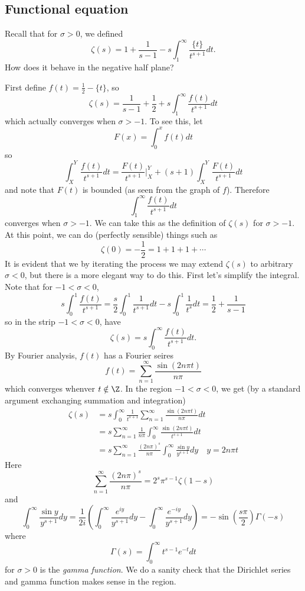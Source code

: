 \documentclass[a4paper]{article}
\theoremstyle{definition}
\begin{document}
\subsection{Functional equation}

Recall that for \(\sigma > 0\), we defined
\[
  \zeta(s) = 1 + \frac{1}{s - 1} - s \int_1^\infty \frac{\{t\}}{t^{s + 1}} dt.
\]
How does it behave in the negative half plane?

First define \(f(t) = \frac{1}{2} - \{t\}\), so
\[
  \zeta(s) = \frac{1}{s - 1} + \frac{1}{2} + s \int_1^\infty \frac{f(t)}{t^{s + 1}} dt
\]
which actually converges when \(\sigma > -1\). To see this, let
\[
  F(x) = \int_0^x f(t) dt
\]
so
\[
  \int_X^Y \frac{f(t)}{t^{s + 1}} dt
  = \frac{F(t)}{t^{s + 1}} \Big|_X^Y + (s + 1) \int_X^Y \frac{F(t)}{t^{s + 1}} dt
\]
and note that \(F(t)\) is bounded (as seen from the graph of \(f\)). Therefore
\[
  \int_1^\infty \frac{f(t)}{t^{s + 1}} dt
\]
converges when \(\sigma > -1\). We can take this as the definition of \(\zeta(s)\) for \(\sigma > -1\). At this point, we can do (perfectly sensible) things such as
\[
  \zeta(0) = -\frac{1}{2} = 1 + 1 + 1 + \cdots
\]
It is evident that we by iterating the process we may extend \(\zeta(s)\) to arbitrary \(\sigma < 0\), but there is a more elegant way to do this. First let's simplify the integral. Note that for \(-1 < \sigma < 0\),
\[
  s \int_0^1 \frac{f(t)}{t^{s + 1}}
  = \frac{s}{2} \int_0^1 \frac{1}{t^{s + 1}} dt - s \int_0^1 \frac{1}{t^s} dt
  = \frac{1}{2} + \frac{1}{s - 1}
\]
so in the strip \(-1 < \sigma < 0\), have
\[
  \zeta(s) = s \int_0^\infty \frac{f(t)}{t^{s + 1}} dt.
\]
By Fourier analysis, \(f(t)\) has a Fourier seires
\[
  f(t) = \sum_{n = 1}^\infty \frac{\sin (2n \pi t)}{n \pi}
\]
which converges whenver \(t \notin \Z\). In the region \(-1 < \sigma < 0\), we get (by a standard argument exchanging summation and integration)
\begin{align*}
  \zeta(s)
  &= s \int_0^\infty \frac{1}{t^{s + 1}} \sum_{n = 1}^\infty \frac{\sin (2n \pi t)}{n \pi} dt \\
  &= s \sum_{n = 1}^\infty \frac{1}{n\pi} \int_0^\infty \frac{\sin(2n \pi t)}{t^{s + 1}} dt \\
  &= s \sum_{n = 1}^\infty \frac{(2n\pi)^s}{n\pi} \int_0^\infty \frac{\sin y}{y^{s + 1}} dy \quad y = 2n\pi t
\end{align*}
Here
\[
  \sum_{n = 1}^\infty \frac{(2n\pi)^s}{n\pi} = 2^s \pi^{s - 1} \zeta(1 - s)
\]
and
\[
  \int_0^\infty \frac{\sin y}{y^{s + 1}} dy
  = \frac{1}{2i} \left( \int_0^\infty \frac{e^{iy}}{y^{s + 1}} dy - \int_0^\infty \frac{e^{-iy}}{y^{s + 1}} dy \right)
  = - \sin \left( \frac{s\pi}{2} \right) \Gamma(-s)
\]
where
\[
  \Gamma(s) = \int_0^\infty t^{s - 1}e^{-t} dt
\]
for \(\sigma > 0\) is the \emph{gamma function}. We do a sanity check that the Dirichlet series and gamma function makes sense in the region.
\end{document}
